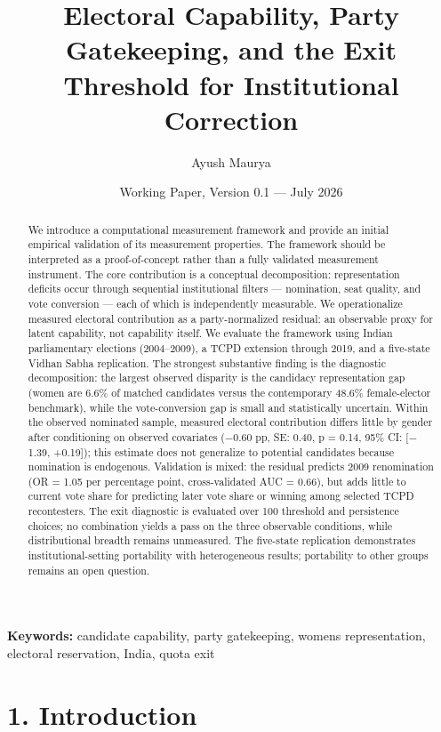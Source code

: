 \documentclass[
]{article}
\title{Electoral Capability, Party Gatekeeping, and the Exit Threshold for Institutional Correction}
\author{Ayush Maurya}
\date{Working Paper, Version 0.1 --- July 2026}
\begin{document}
\maketitle

\begin{abstract}
We introduce a computational measurement framework and provide an initial empirical validation of its measurement properties. The framework should be interpreted as a proof-of-concept rather than a fully validated measurement instrument. The core contribution is a conceptual decomposition: representation deficits occur through sequential institutional filters --- nomination, seat quality, and vote conversion --- each of which is independently measurable. We operationalize measured electoral contribution as a party-normalized residual: an observable proxy for latent capability, not capability itself. We evaluate the framework using Indian parliamentary elections (2004--2009), a TCPD extension through 2019, and a five-state Vidhan Sabha replication. The strongest substantive finding is the diagnostic decomposition: the largest observed disparity is the candidacy representation gap (women are 6.6\% of matched candidates versus the contemporary 48.6\% female-elector benchmark), while the vote-conversion gap is small and statistically uncertain. Within the observed nominated sample, measured electoral contribution differs little by gender after conditioning on observed covariates ($-$0.60 pp, SE: 0.40, p = 0.14, 95\% CI: {[}$-$1.39, +0.19{]}); this estimate does not generalize to potential candidates because nomination is endogenous. Validation is mixed: the residual predicts 2009 renomination (OR = 1.05 per percentage point, cross-validated AUC = 0.66), but adds little to current vote share for predicting later vote share or winning among selected TCPD recontesters. The exit diagnostic is evaluated over 100 threshold and persistence choices; no combination yields a pass on the three observable conditions, while distributional breadth remains unmeasured. The five-state replication demonstrates institutional-setting portability with heterogeneous results; portability to other groups remains an open question.

\end{abstract}

\noindent\textbf{Keywords:} candidate capability, party gatekeeping, women\textquotesingle s representation, electoral reservation, India, quota exit

\section{1. Introduction}\label{1-introduction}
\end{document}
